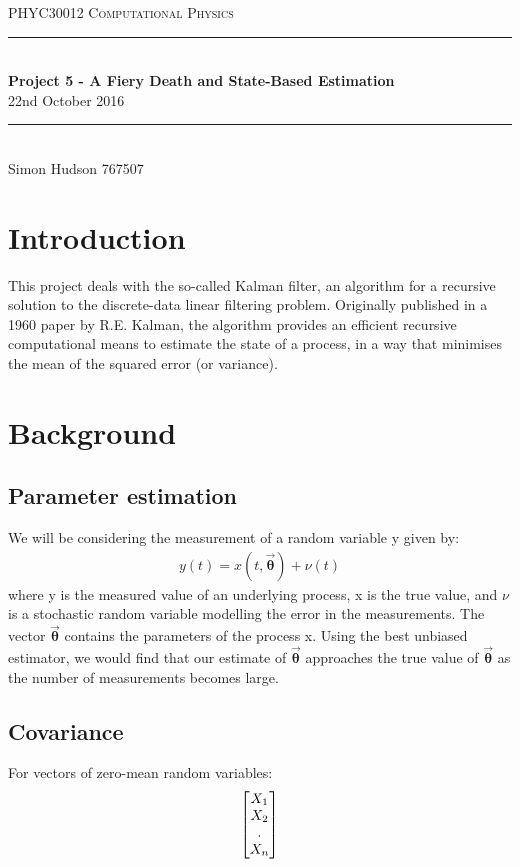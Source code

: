 \documentclass[a4paper]{article}
\newcommand{\HRule}{\rule{\linewidth}{0.5mm}}
\begin{document}
\begin{center}
\textsc{\Large PHYC30012 Computational Physics}\\[0.3cm]

\HRule \\[0.4cm]

{\LARGE \bfseries Project 5 - A Fiery Death and State-Based Estimation \\[0.4cm] }
{\Large 22nd October 2016 \\}

\HRule \\[0.3cm]

{\large Simon Hudson 767507\\[0.5cm]}

\end{center}

\section{Introduction}
This project deals with the so-called Kalman filter, an algorithm for a recursive solution to the discrete-data linear filtering problem. Originally published in a 1960 paper by R.E. Kalman, the algorithm provides an efficient recursive computational means to estimate the state of a process, in a way that minimises the mean of the squared error (or variance)\cite{Manual}.

\section{Background}\label{Background}
	\subsection{Parameter estimation}\label{Parameter_estimation}
		We will be considering the measurement of a random variable y given by:
		\begin{align}
			y(t)=x(t,\bm{\vec{\theta}}) + \nu(t)\label{Underlying_process_equ}
		\end{align}
		\noindent where y is the measured value of an underlying process, x is the true value, and $\nu$ is a stochastic random variable modelling the error in the measurements. The vector $\bm{\vec{\theta}}$ contains the parameters of the process x. Using the best unbiased estimator, we would find that our estimate of $\bm{\vec{\theta}}$ approaches the true value of $\bm{\vec{\theta}}$ as the number of measurements becomes large.

	\subsection{Covariance}\label{Covariance}
		For vectors of zero-mean random variables:
		\begin{align}
			\begin{bmatrix}
				X_{1}\\
				X_{2}\\
				\hdotsfor{1} \\
				X_{n}
			\end{bmatrix}
		\end{align}
		
\end{document}
